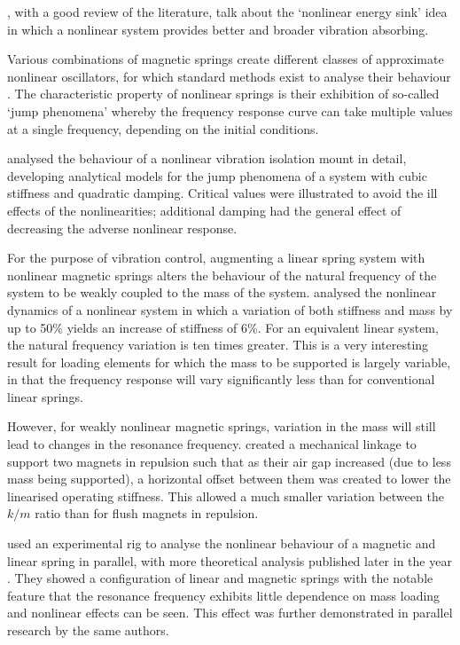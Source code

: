 \textcite{starosvetsky2008}, with a good review of the literature, talk about the `nonlinear energy sink' idea in which a nonlinear system provides better and broader vibration absorbing.

Various combinations of magnetic springs create different classes of approximate nonlinear oscillators, for which standard methods exist to analyse their behaviour .
The characteristic property of nonlinear springs is their exhibition of so-called `jump phenomena' whereby the frequency response curve can take multiple values at a single frequency, depending on the initial conditions.

\textcite{jazar2006} analysed the behaviour of a nonlinear vibration isolation mount in detail, developing analytical models for the jump phenomena of a system with cubic stiffness and quadratic damping.
Critical values were illustrated to avoid the ill effects of the nonlinearities; additional damping had the general effect of decreasing the adverse nonlinear response.

For the purpose of vibration control, augmenting a linear spring system with nonlinear magnetic springs alters the behaviour of the natural frequency of the system to be weakly coupled to the mass of the system.
\textcite{dangola2006} analysed the nonlinear dynamics of a nonlinear system in which a variation of both stiffness and mass by up to 50\% yields an increase of stiffness of 6\%.
For an equivalent linear system, the natural frequency variation is ten times greater.
This is a very interesting result for loading elements for which the mass to be supported is largely variable, in that the frequency response will vary significantly less than for conventional linear springs.

However, for weakly nonlinear magnetic springs, variation in the mass will still lead to changes in the resonance frequency.
\textcite{todaka2001} created a mechanical linkage to support two magnets in repulsion such that as their air gap increased (due to less mass being supported), a horizontal offset between them was created to lower the linearised operating stiffness.
This allowed a much smaller variation between the $k/m$ ratio than for flush magnets in repulsion.

\textcite{bonisoli2007-mssp} used an experimental rig to analyse the nonlinear behaviour of a magnetic and linear spring in parallel, with more theoretical analysis published later in the year \cite{bonisoli2007-mrc}.
They showed a configuration of linear and magnetic springs with the notable feature that the resonance frequency exhibits little dependence on mass loading and nonlinear effects can be seen.
This effect was further demonstrated in parallel research by the same authors.

